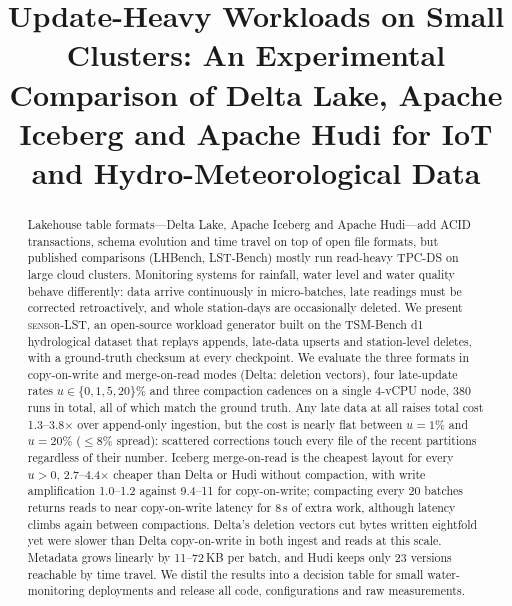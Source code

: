 \documentclass[conference]{IEEEtran}
\newcommand{\sys}{\textsc{sensor-LST}}
\begin{document}
\title{Update-Heavy Workloads on Small Clusters: An Experimental Comparison of Delta Lake, Apache Iceberg and Apache Hudi for IoT and Hydro-Meteorological Data}

\author{
}

\maketitle

\begin{abstract}
Lakehouse table formats---Delta Lake, Apache Iceberg and Apache Hudi---add ACID transactions, schema evolution and
time travel on top of open file formats, but published comparisons (LHBench, LST-Bench) mostly run read-heavy TPC-DS
on large cloud clusters. Monitoring systems for rainfall, water level and water quality behave differently: data
arrive continuously in micro-batches, late readings must be corrected retroactively, and whole station-days are
occasionally deleted. We present \sys{}, an open-source workload generator built on the TSM-Bench d1 hydrological
dataset that replays appends, late-data upserts and station-level deletes, with a ground-truth checksum at every
checkpoint. We evaluate the three formats in copy-on-write and merge-on-read modes (Delta: deletion vectors),
four late-update rates $u\in\{0,1,5,20\}\%$ and three compaction cadences on a single 4-vCPU node, 380 runs in
total, all of which match the ground truth. Any late data at all raises total cost 1.3--3.8$\times$ over append-only
ingestion, but the cost is nearly flat between $u=1\%$ and $u=20\%$ ($\le$8\% spread): scattered corrections touch
every file of the recent partitions regardless of their number. Iceberg merge-on-read is the cheapest layout for every
$u>0$, 2.7--4.4$\times$ cheaper than Delta or Hudi without compaction, with write amplification 1.0--1.2 against
9.4--11 for copy-on-write; compacting every 20 batches returns reads to near copy-on-write latency for 8\,s of extra work, although latency climbs again between compactions.
Delta's deletion vectors cut bytes written eightfold yet were slower than Delta copy-on-write in both ingest and reads
at this scale. Metadata grows linearly by 11--72\,KB per batch, and Hudi keeps only 23 versions reachable by time
travel. We distil the results into a decision table for small water-monitoring deployments and release all code,
configurations and raw measurements.
\end{abstract}
\end{document}
